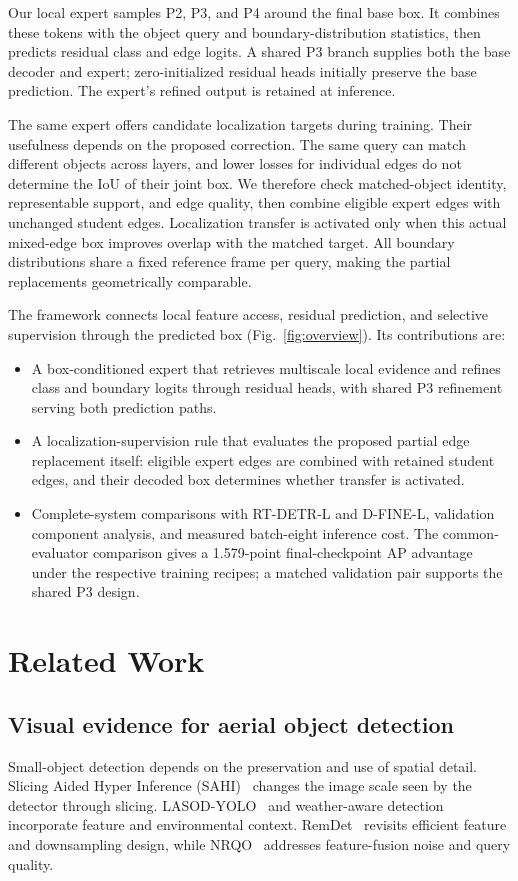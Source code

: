 Our local expert samples P2, P3, and P4 around the final base box. It combines these tokens with the object query and boundary-distribution statistics, then predicts residual class and edge logits. A shared P3 branch supplies both the base decoder and expert; zero-initialized residual heads initially preserve the base prediction. The expert's refined output is retained at inference.

The same expert offers candidate localization targets during training. Their usefulness depends on the proposed correction. The same query can match different objects across layers, and lower losses for individual edges do not determine the IoU of their joint box. We therefore check matched-object identity, representable support, and edge quality, then combine eligible expert edges with unchanged student edges. Localization transfer is activated only when this actual mixed-edge box improves overlap with the matched target. All boundary distributions share a fixed reference frame per query, making the partial replacements geometrically comparable.

The framework connects local feature access, residual prediction, and selective supervision through the predicted box (Fig.~\ref{fig:overview}). Its contributions are:
\begin{itemize}
\item A box-conditioned expert that retrieves multiscale local evidence and refines class and boundary logits through residual heads, with shared P3 refinement serving both prediction paths.
\item A localization-supervision rule that evaluates the proposed partial edge replacement itself: eligible expert edges are combined with retained student edges, and their decoded box determines whether transfer is activated.
\item Complete-system comparisons with RT-DETR-L and D-FINE-L, validation component analysis, and measured batch-eight inference cost. The common-evaluator comparison gives a 1.579-point final-checkpoint AP advantage under the respective training recipes; a matched validation pair supports the shared P3 design.
\end{itemize}

\section{Related Work}
\subsection{Visual evidence for aerial object detection}
Small-object detection depends on the preservation and use of spatial detail. Slicing Aided Hyper Inference (SAHI)~\cite{akyon2022sahi} changes the image scale seen by the detector through slicing. LASOD-YOLO~\cite{wang2026lasod} and weather-aware detection~\cite{kim2024weather} incorporate feature and environmental context. RemDet~\cite{li2025remdet} revisits efficient feature and downsampling design, while NRQO~\cite{fang2025nrqo} addresses feature-fusion noise and query quality.

